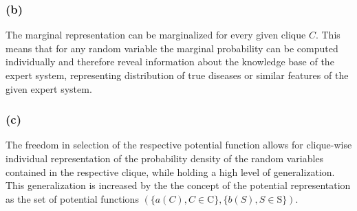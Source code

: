 \documentclass[11pt,a4paper]{article}
\begin{document}
	
	\subsubsection*{(b)}
	The marginal representation can be marginalized for every given clique $C$. This means that for any random variable the marginal probability can be computed individually and therefore reveal information about the knowledge base of the expert system, representing distribution of true diseases or similar features of the given expert system.
	
	\subsubsection*{(c)}
	The freedom in selection of the respective potential function allows for clique-wise individual representation of the probability density of the random variables contained in the respective clique, while holding a high level of generalization. This generalization is increased by the the concept of the  potential representation as the set of potential functions 
	$(\{a(C),C \in \mathrm{C}\},\{b(S),S \in \mathrm{S}\})$.
	
\end{document}
